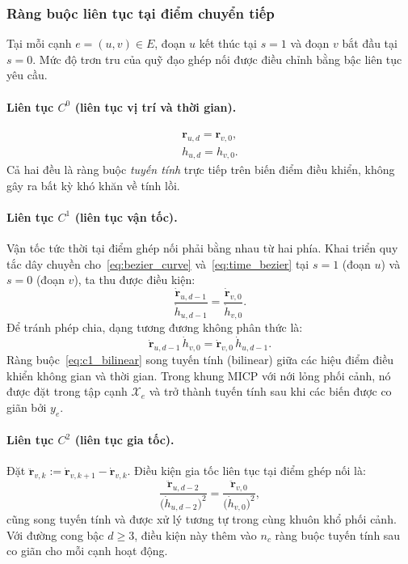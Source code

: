 \subsubsection{Ràng buộc liên tục tại điểm chuyển tiếp}
\label{subsubsec:continuity}

Tại mỗi cạnh $e = (u,v) \in E$, đoạn $u$ kết thúc tại $s=1$ và đoạn $v$ bắt đầu
tại $s=0$. Mức độ trơn tru của quỹ đạo ghép nối được điều chỉnh bằng bậc liên
tục yêu cầu.

\paragraph{Liên tục $C^0$ (liên tục vị trí và thời gian).}
\begin{align}
    \mathbf{r}_{u,d} = \mathbf{r}_{v,0},
    \label{eq:c0_pos} \\
    h_{u,d} = h_{v,0}.
    \label{eq:c0_time}
\end{align}
Cả hai đều là ràng buộc \emph{tuyến tính} trực tiếp trên biến điểm điều khiển,
không gây ra bất kỳ khó khăn về tính lồi.

\paragraph{Liên tục $C^1$ (liên tục vận tốc).}
Vận tốc tức thời tại điểm ghép nối phải bằng nhau từ hai phía. Khai triển quy
tắc dây chuyền cho~\eqref{eq:bezier_curve} và~\eqref{eq:time_bezier} tại $s=1$
(đoạn $u$) và $s=0$ (đoạn $v$), ta thu được điều kiện:
\begin{equation}
    \frac{\dot{\mathbf{r}}_{u,d-1}}{\dot{h}_{u,d-1}}
    =
    \frac{\dot{\mathbf{r}}_{v,0}}{\dot{h}_{v,0}}.
    \label{eq:c1_vel}
\end{equation}
Để tránh phép chia, dạng tương đương không phân thức là:
\begin{equation}
    \dot{\mathbf{r}}_{u,d-1}\, \dot{h}_{v,0}
    =
    \dot{\mathbf{r}}_{v,0}\, \dot{h}_{u,d-1}.
    \label{eq:c1_bilinear}
\end{equation}
Ràng buộc~\eqref{eq:c1_bilinear} song tuyến tính (bilinear) giữa các hiệu điểm
điều khiển không gian và thời gian.
Trong khung MICP với nới lỏng phối cảnh, nó được đặt trong tập cạnh
$\mathcal{X}_e$ và trở thành tuyến tính sau khi các biến được co giãn bởi $y_e$.

\paragraph{Liên tục $C^2$ (liên tục gia tốc).}
Đặt $\ddot{\mathbf{r}}_{v,k} := \dot{\mathbf{r}}_{v,k+1} - \dot{\mathbf{r}}_{v,k}$.
Điều kiện gia tốc liên tục tại điểm ghép nối là:
\begin{equation}
    \frac{\ddot{\mathbf{r}}_{u,d-2}}{\bigl(\dot{h}_{u,d-2}\bigr)^2}
    =
    \frac{\ddot{\mathbf{r}}_{v,0}}{\bigl(\dot{h}_{v,0}\bigr)^2},
    \label{eq:c2_acc}
\end{equation}
cũng song tuyến tính và được xử lý tương tự trong cùng khuôn khổ phối cảnh.
Với đường cong bậc $d \ge 3$, điều kiện này thêm vào $n_c$ ràng buộc tuyến tính
sau co giãn cho mỗi cạnh hoạt động.

